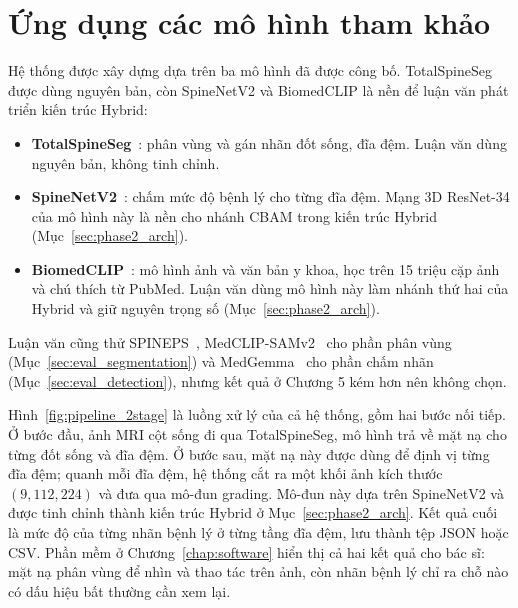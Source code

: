 \section{Ứng dụng các mô hình tham khảo}
\label{sec:pipeline_overview}
Hệ thống được xây dựng dựa trên ba mô hình đã được công bố. TotalSpineSeg được dùng nguyên bản, còn SpineNetV2 và BiomedCLIP là nền để luận văn phát triển kiến trúc Hybrid:
\begin{itemize}
    \item \textbf{TotalSpineSeg}~\cite{warszawer2025totalspineseg}: phân vùng và gán nhãn đốt sống, đĩa đệm. Luận văn dùng nguyên bản, không tinh chỉnh.

    \item \textbf{SpineNetV2}~\cite{windsor2022spinenetv2}: chấm mức độ bệnh lý cho từng đĩa đệm. Mạng 3D ResNet-34 của mô hình này là nền cho nhánh CBAM trong kiến trúc Hybrid (Mục~\ref{sec:phase2_arch}).

    \item \textbf{BiomedCLIP}~\cite{zhang2024biomedclip}: mô hình ảnh và văn bản y khoa, học trên 15 triệu cặp ảnh và chú thích từ PubMed. Luận văn dùng mô hình này làm nhánh thứ hai của Hybrid và giữ nguyên trọng số (Mục~\ref{sec:phase2_arch}).
\end{itemize}
Luận văn cũng thử SPINEPS~\cite{moller2024spineps}, MedCLIP-SAMv2~\cite{koleilat2025medclipsamv2} cho phần phân vùng (Mục~\ref{sec:eval_segmentation}) và MedGemma~\cite{google2025medgemma} cho phần chấm nhãn (Mục~\ref{sec:eval_detection}), nhưng kết quả ở Chương 5 kém hơn nên không chọn.

Hình~\ref{fig:pipeline_2stage} là luồng xử lý của cả hệ thống, gồm hai bước nối tiếp. Ở bước đầu, ảnh MRI cột sống đi qua TotalSpineSeg, mô hình trả về mặt nạ cho từng đốt sống và đĩa đệm. Ở bước sau, mặt nạ này được dùng để định vị từng đĩa đệm; quanh mỗi đĩa đệm, hệ thống cắt ra một khối ảnh kích thước $(9, 112, 224)$ và đưa qua mô-đun grading. Mô-đun này dựa trên SpineNetV2 và được tinh chỉnh thành kiến trúc Hybrid ở Mục~\ref{sec:phase2_arch}. Kết quả cuối là mức độ của từng nhãn bệnh lý ở từng tầng đĩa đệm, lưu thành tệp JSON hoặc CSV. Phần mềm ở Chương~\ref{chap:software} hiển thị cả hai kết quả cho bác sĩ: mặt nạ phân vùng để nhìn và thao tác trên ảnh, còn nhãn bệnh lý chỉ ra chỗ nào có dấu hiệu bất thường cần xem lại.

